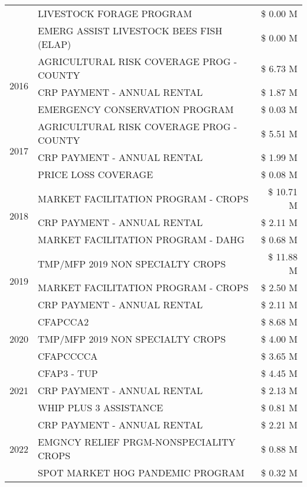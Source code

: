 \begin{tabular}{llr}
 & LIVESTOCK FORAGE PROGRAM & \$ 0.00 M \\
 & EMERG ASSIST LIVESTOCK BEES FISH (ELAP) & \$ 0.00 M \\
\cline{1-3}
\multirow[t]{3}{*}{2016} & AGRICULTURAL RISK COVERAGE PROG - COUNTY & \$ 6.73 M \\
 & CRP PAYMENT - ANNUAL RENTAL & \$ 1.87 M \\
 & EMERGENCY CONSERVATION PROGRAM & \$ 0.03 M \\
\cline{1-3}
\multirow[t]{3}{*}{2017} & AGRICULTURAL RISK COVERAGE PROG - COUNTY & \$ 5.51 M \\
 & CRP PAYMENT - ANNUAL RENTAL & \$ 1.99 M \\
 & PRICE LOSS COVERAGE & \$ 0.08 M \\
\cline{1-3}
\multirow[t]{3}{*}{2018} & MARKET FACILITATION PROGRAM - CROPS & \$ 10.71 M \\
 & CRP PAYMENT - ANNUAL RENTAL & \$ 2.11 M \\
 & MARKET FACILITATION PROGRAM - DAHG & \$ 0.68 M \\
\cline{1-3}
\multirow[t]{3}{*}{2019} & TMP/MFP 2019 NON SPECIALTY CROPS & \$ 11.88 M \\
 & MARKET FACILITATION PROGRAM - CROPS & \$ 2.50 M \\
 & CRP PAYMENT - ANNUAL RENTAL & \$ 2.11 M \\
\cline{1-3}
\multirow[t]{3}{*}{2020} & CFAPCCA2 & \$ 8.68 M \\
 & TMP/MFP 2019 NON SPECIALTY CROPS & \$ 4.00 M \\
 & CFAPCCCCA & \$ 3.65 M \\
\cline{1-3}
\multirow[t]{3}{*}{2021} & CFAP3 - TUP & \$ 4.45 M \\
 & CRP PAYMENT - ANNUAL RENTAL & \$ 2.13 M \\
 & WHIP PLUS 3 ASSISTANCE & \$ 0.81 M \\
\cline{1-3}
\multirow[t]{3}{*}{2022} & CRP PAYMENT - ANNUAL RENTAL & \$ 2.21 M \\
 & EMGNCY RELIEF PRGM-NONSPECIALITY CROPS & \$ 0.88 M \\
 & SPOT MARKET HOG PANDEMIC PROGRAM & \$ 0.32 M \\
\cline{1-3}
\bottomrule
\end{tabular}
